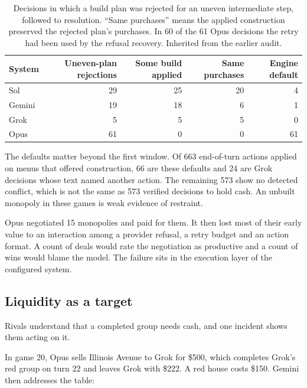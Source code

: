 \begin{table}[t]
\centering\small
\begin{tabular}{lrrrr}
\toprule
System & Uneven-plan rejections & Some build applied & Same purchases & Engine default\\
\midrule
Sol & 29 & 25 & 20 & 4\\
Gemini & 19 & 18 & 6 & 1\\
Grok & 5 & 5 & 5 & 0\\
Opus & 61 & 0 & 0 & 61\\
\bottomrule
\end{tabular}
\caption{Decisions in which a build plan was rejected for an uneven intermediate step, followed to resolution. ``Same purchases'' means the applied construction preserved the rejected plan's purchases. In 60 of the 61 Opus decisions the retry had been used by the refusal recovery. Inherited from the earlier audit.}
\label{tab:recovery}
\end{table}

The defaults matter beyond the first window. Of 663 end-of-turn actions applied on menus that offered construction, 66 are these defaults and 24 are Grok decisions whose text named another action. The remaining 573 show no detected conflict, which is not the same as 573 verified decisions to hold cash. An unbuilt monopoly in these games is weak evidence of restraint.

Opus negotiated 15 monopolies and paid for them. It then lost most of their early value to an interaction among a provider refusal, a retry budget and an action format. A count of deals would rate the negotiation as productive and a count of wins would blame the model. The failure sits in the execution layer of the configured system.

\subsection{Liquidity as a target}

Rivals understand that a completed group needs cash, and one incident shows them acting on it.


In game 20, Opus sells Illinois Avenue to Grok for \$500, which completes Grok's red group on turn 22 and leaves Grok with \$222. A red house costs \$150. Gemini then addresses the table:


